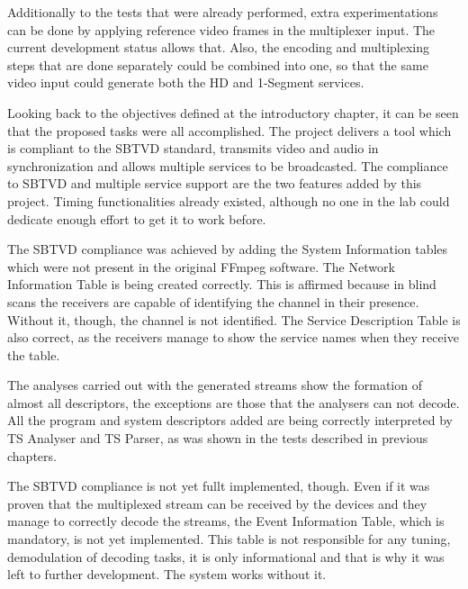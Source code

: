 \documentclass[
	12pt,				%
	openright,			%
	twoside,			%
	a4paper,			%
	brazil,
	french,				%
	english
	]{abntex2}
\begin{document}
	
Additionally to the tests that were already performed, extra experimentations can be done by applying reference video frames in the multiplexer input. The current development status allows that. Also, the encoding and multiplexing steps that are done separately could be combined into one, so that the same video input could generate both the HD and 1-Segment services.
	

Looking back to the objectives defined at the introductory chapter, it can be seen that the proposed tasks were all accomplished. The project delivers a tool which is compliant to the SBTVD standard, transmits video and audio in synchronization and allows multiple services to be broadcasted. The compliance to SBTVD and multiple service support are the two features added by this project. Timing functionalities already existed, although no one in the lab could dedicate enough effort to get it to work before.

The SBTVD compliance was achieved by adding the System Information tables which were not present in the original FFmpeg software. The Network Information Table is being created correctly. This is affirmed because in blind scans the receivers are capable of identifying the channel in their presence. Without it, though, the channel is not identified. The Service Description Table is also correct, as the receivers manage to show the service names when they receive the table.

The analyses carried out with the generated streams show the formation of almost all descriptors, the exceptions are those that the analysers can not decode. All the program and system descriptors added are being correctly interpreted by TS Analyser and TS Parser, as was shown in the tests described in previous chapters.

The SBTVD compliance is not yet fullt implemented, though. Even if it was proven that the multiplexed stream can be received by the devices and they manage to correctly decode the streams, the Event Information Table, which is mandatory, is not yet implemented. This table is not responsible for any tuning, demodulation of decoding tasks, it is only informational and that is why it was left to further development. The system works without it.
\end{document}
